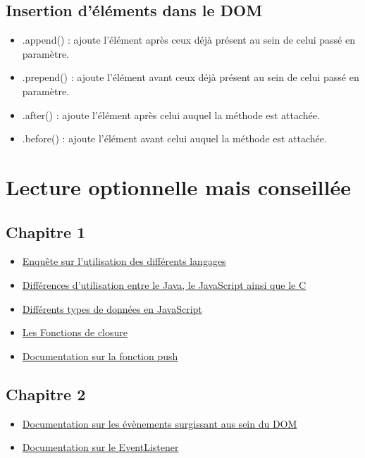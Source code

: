 \documentclass{article}[12pt]
\begin{document}
\subsection{Insertion d'éléments dans le DOM}
\begin{itemize}
	\item .append() : ajoute l'élément après ceux déjà présent au sein de celui passé en paramètre.
    \item .prepend() : ajoute l'élément avant ceux déjà présent au sein de celui passé en paramètre.
   	\item .after() : ajoute l'élément après celui auquel la méthode est attachée.
    \item .before() : ajoute l'élément avant celui auquel la méthode est attachée.
\end{itemize}

\section{Lecture optionnelle mais conseillée}
\subsection{Chapitre 1}
\begin{itemize}
	\item \href{http://stackoverflow.com/research/developer-survey-2016}{Enquête sur l'utilisation des différents langages}
    \item \href{http://www.stefankrause.net/wp/?p=144}{Différences d'utilisation entre le Java, le JavaScript ainsi que le C}
    \item \href{http://www.w3schools.com/js/js_datatypes.asp}{Différents types de données en JavaScript}
    \item \href{http://www.w3schools.com/js/js_function_closures.asp}{Les Fonctions de closure}
	\item \href{http://www.w3schools.com/jsref/jsref_push.asp}{Documentation sur la fonction push}
\end{itemize}
\subsection{Chapitre 2}
\begin{itemize}
    \item \href{http://www.w3schools.com/jsref/dom_obj_event.asp}{Documentation sur les évènements surgissant aus sein du DOM}
    \item \href{http://www.w3schools.com/js/js_htmldom_eventlistener.asp}{Documentation sur le EventListener}
\end{itemize}
\end{document}

